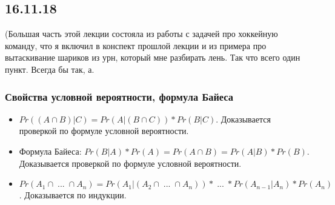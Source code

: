 \subsection{16.11.18}
(Большая часть этой лекции состояла из работы с задачей про хоккейную команду, что я включил в конспект прошлой лекции и из примера про вытаскивание шариков из урн, который мне разбирать лень. Так что всего один пункт. Всегда бы так, а.
\subsubsection{Свойства условной вероятности, формула Байеса}
\begin{itemize}
\item $Pr((A \cap B)|C) = Pr(A|(B \cap C)) * Pr(B|C)$. Доказывается проверкой по формуле условной вероятности.\\
\item Формула Байеса: $Pr(B|A) * Pr(A) = Pr(A \cap B) = Pr(A|B) * Pr(B)$. Доказывается проверкой по формуле условной вероятности.\\
\item $Pr(A_1 \cap \; ... \; \cap A_n) = Pr(A_1|(A_2 \cap \; ... \; \cap A_n)) * \; ... \; * Pr(A_{n - 1}|A_n) * Pr(A_n)$. Доказывается по индукции.\\
\end{itemize}
